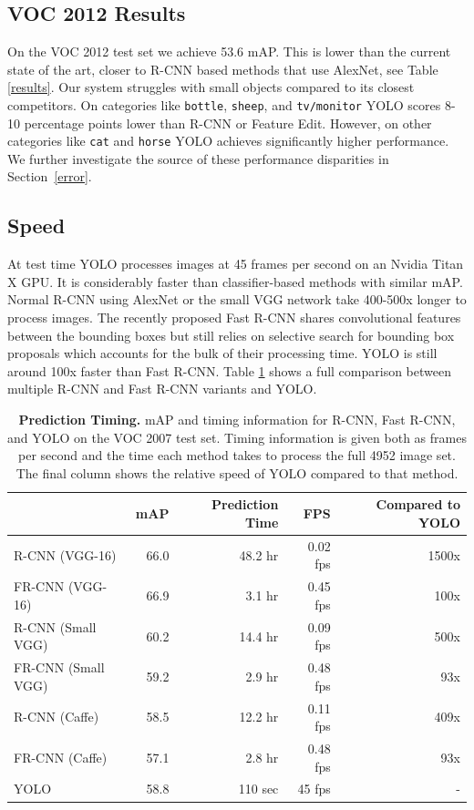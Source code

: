 \documentclass{article} %
\begin{document}
\subsection{VOC 2012 Results}

On the VOC 2012 test set we achieve 53.6 mAP. This is lower than the current state of the art, closer to R-CNN based methods that use AlexNet, see Table \ref{results}. Our system struggles with small objects compared to its closest competitors. On categories like \texttt{bottle}, \texttt{sheep}, and \texttt{tv/monitor} YOLO scores 8-10 percentage points lower than R-CNN or Feature Edit. However, on other categories like \texttt{cat} and \texttt{horse} YOLO achieves significantly higher performance. We further investigate the source of these performance disparities in Section~\ref{error}.

\subsection{Speed}

At test time YOLO processes images at 45 frames per second on an Nvidia Titan X GPU. It is considerably faster than classifier-based methods with similar mAP. Normal R-CNN using AlexNet or the small VGG network take 400-500x longer to process images. The recently proposed Fast R-CNN shares convolutional features between the bounding boxes but still relies on selective search for bounding box proposals which accounts for the bulk of their processing time. YOLO is still around 100x faster than Fast R-CNN. Table \ref{timing} shows a full comparison between multiple R-CNN and Fast R-CNN variants and YOLO.

\begin{table}[h]
\begin{center}
\begin{tabular}{lrrrr}
 & mAP & Prediction Time & FPS & Compared to YOLO\\
\hline
R-CNN (VGG-16) & 66.0 & 48.2 hr & 0.02 fps & 1500x \\
FR-CNN (VGG-16) & 66.9 & 3.1 hr & 0.45 fps & 100x \\
R-CNN (Small VGG) & 60.2 & 14.4 hr & 0.09 fps & 500x \\
FR-CNN (Small VGG) & 59.2 & 2.9 hr & 0.48 fps & 93x \\
R-CNN (Caffe) & 58.5 & 12.2 hr & 0.11 fps & 409x \\
FR-CNN (Caffe) & 57.1 & 2.8 hr & 0.48 fps & 93x \\
YOLO & 58.8 & 110 sec & 45 fps & - \\
\end{tabular}
\end{center}
\caption{\small \textbf{Prediction Timing.} mAP and timing information for R-CNN, Fast R-CNN, and YOLO on the VOC 2007 test set. Timing information is given both as frames per second and the time each method takes to process the full 4952 image set. The final column shows the relative speed of YOLO compared to that method.}
\label{timing}
\end{table}
\end{document}

